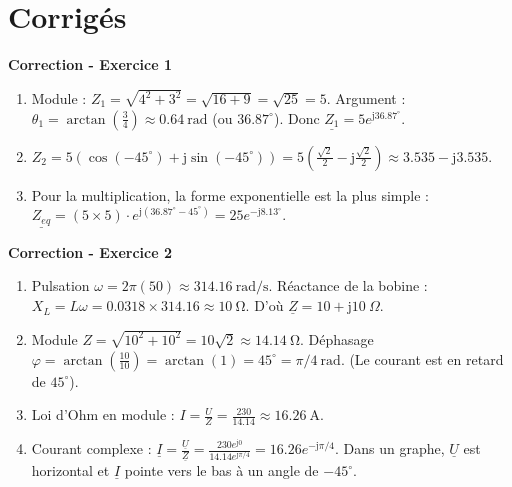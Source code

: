 \documentclass[11pt,a4paper]{article}
\newcommand{\jc}{\mathrm{j}} %
\newcommand{\cpx}[1]{\underline{#1}} %
\begin{document}
\newpage
\section{Corrigés}

\textbf{Correction - Exercice 1}
\begin{enumerate}
    \item Module : $Z_1 = \sqrt{4^2 + 3^2} = \sqrt{16 + 9} = \sqrt{25} = 5$. Argument : $\theta_1 = \arctan(\frac{3}{4}) \approx \SI{0.64}{\radian}$ (ou $36.87^\circ$). Donc $\cpx{Z_1} = 5 e^{\jc 36.87^\circ}$.
    \item $Z_2 = 5\left( \cos(-45^\circ) + \jc\sin(-45^\circ) \right) = 5\left( \frac{\sqrt{2}}{2} - \jc\frac{\sqrt{2}}{2} \right) \approx 3.535 - \jc 3.535$.
    \item Pour la multiplication, la forme exponentielle est la plus simple : $\cpx{Z_{eq}} = (5 \times 5) \cdot e^{\jc(36.87^\circ - 45^\circ)} = 25 e^{-\jc 8.13^\circ}$.
\end{enumerate}

\textbf{Correction - Exercice 2}
\begin{enumerate}
    \item Pulsation $\omega = 2\pi(50) \approx \SI{314.16}{\radian\per\second}$. Réactance de la bobine : $X_L = L\omega = 0.0318 \times 314.16 \approx \SI{10}{\ohm}$. D'où $\cpx{Z} = 10 + \jc 10\ \Omega$.
    \item Module $Z = \sqrt{10^2 + 10^2} = 10\sqrt{2} \approx \SI{14.14}{\ohm}$. Déphasage $\varphi = \arctan(\frac{10}{10}) = \arctan(1) = 45^\circ = \pi/4\ \text{rad}$. (Le courant est en retard de $45^\circ$).
    \item Loi d'Ohm en module : $I = \frac{U}{Z} = \frac{230}{14.14} \approx \SI{16.26}{\ampere}$.
    \item Courant complexe : $\cpx{I} = \frac{\cpx{U}}{\cpx{Z}} = \frac{230 e^{\jc 0}}{14.14 e^{\jc \pi/4}} = 16.26 e^{-\jc \pi/4}$. Dans un graphe, $\cpx{U}$ est horizontal et $\cpx{I}$ pointe vers le bas à un angle de $-45^\circ$.
\end{enumerate}
\end{document}
